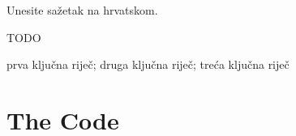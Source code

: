 \documentclass[masterthesis]{fer}
\begin{document}
\begin{sazetak}
  Unesite sažetak na hrvatskom.

  TODO
\end{sazetak}

\begin{kljucnerijeci}
  prva ključna riječ; druga ključna riječ; treća ključna riječ
\end{kljucnerijeci}




\backmatter

\chapter{The Code}

\Blindtext
\end{document}
